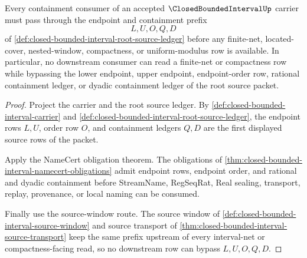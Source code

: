 \begin{theorem}
\label{thm:closed-bounded-interval-endpoint-containment-route}
Every containment consumer of an accepted $\ClosedBoundedIntervalUp$ carrier must pass through the endpoint and containment prefix
$$
L,U,O,Q,D
$$
of \autoref{def:closed-bounded-interval-root-source-ledger} before any finite-net, located-cover, nested-window, compactness, or uniform-modulus row is available. In particular, no downstream consumer can read a finite-net or compactness row while bypassing the lower endpoint, upper endpoint, endpoint-order row, rational containment ledger, or dyadic containment ledger of the root source packet.
\end{theorem}
\begin{proof}
Project the carrier and the root source ledger. By \autoref{def:closed-bounded-interval-carrier} and \autoref{def:closed-bounded-interval-root-source-ledger}, the endpoint rows $L,U$, order row $O$, and containment ledgers $Q,D$ are the first displayed source rows of the packet.

Apply the NameCert obligation theorem. The obligations of \autoref{thm:closed-bounded-interval-namecert-obligations} admit endpoint rows, endpoint order, and rational and dyadic containment before StreamName, RegSeqRat, Real sealing, transport, replay, provenance, or local naming can be consumed.

Finally use the source-window route. The source window of \autoref{def:closed-bounded-interval-source-window} and source transport of \autoref{thm:closed-bounded-interval-source-transport} keep the same prefix upstream of every interval-net or compactness-facing read, so no downstream row can bypass $L,U,O,Q,D$.
\end{proof}

